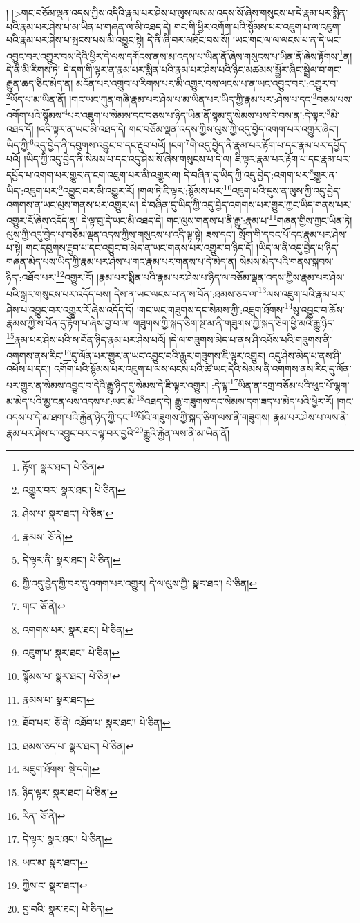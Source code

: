 ། །>གང་བཅོམ་ལྡན་འདས་ཀྱིས་འདིའི་རྣམ་པར་ཤེས་པ་ལུས་ལས་མ་འདས་སོ་ཞེས་གསུངས་པ་དེ་རྣམ་པར་སྨིན་པའི་རྣམ་པར་ཤེས་པ་མ་ཡིན་པ་གཞན་ལ་མི་འཐད་དེ། གང་གི་ཕྱིར་འགོག་པའི་སྙོམས་པར་འཇུག་པ་ལ་འཇུག་པའི་རྣམ་པར་ཤེས་པ་སྤངས་པས་མི་འབྱུང་སྟེ། དེ་ནི་ཞི་བར་མཐོང་བས་སོ། །ཡང་གང་ལ་ལ་ལངས་པ་ན་དེ་ཡང་འབྱུང་བར་འགྱུར་བས་དེའི་ཕྱིར་དེ་ལས་དགོངས་ནས་མ་འདས་པ་ཡིན་ནོ་ཞེས་གསུངས་པ་ཡིན་ནོ་ཞེས་རྟོགས་\footnote{རྟོག་  སྣར་ཐང་།  པེ་ཅིན། }ན། དེ་ནི་མི་རིགས་ཏེ། དེ་དག་གི་ལྟར་ན་རྣམ་པར་སྨིན་པའི་རྣམ་པར་ཤེས་པའི་ཉིང་མཚམས་སྦྱོར་ཞིང་སྦྲེལ་བ་གང་རྒྱུན་ཆད་ཅིང་མེད་ན། མངོན་པར་འགྲུབ་པ་རིགས་པར་མི་འགྱུར་བས་ལངས་པ་ན་ཡང་འབྱུང་བར་:འགྱུར་བ་\footnote{འགྱུར་བར་  སྣར་ཐང་།  པེ་ཅིན། }ཡོད་པ་མ་ཡིན་ནོ། །གང་ཡང་ཀུན་གཞི་རྣམ་པར་ཤེས་པ་མ་ཡིན་པར་ཡིད་ཀྱི་རྣམ་པར་:ཤེས་པ་དང་\footnote{ཤེས་པ་  སྣར་ཐང་།  པེ་ཅིན། }བཅས་པས་འགོག་པའི་སྙོམས་\footnote{རྣམས་  ཅོ་ནེ། }པར་འཇུག་པ་སེམས་དང་བཅས་པ་ཉིད་ཡིན་ནོ་སྙམ་དུ་སེམས་པས་དེ་བས་ན་:དེ་ལྟར་\footnote{དེ་ལྟར་ནི་  སྣར་ཐང་།  པེ་ཅིན། }མི་འཐད་དོ། །འདི་ལྟར་ན་ཡང་མི་འཐད་དེ། གང་བཅོམ་ལྡན་འདས་ཀྱིས་ལུས་ཀྱི་འདུ་བྱེད་འགག་པར་འགྱུར་ཞིང་། ཡིད་ཀྱི་\footnote{ཀྱི་འདུ་བྱེད་ཀྱི་བར་དུ་འགག་པར་འགྱུར། དེ་ལ་ལུས་ཀྱི་  སྣར་ཐང་།  པེ་ཅིན། }འདུ་བྱེད་ནི་དབུགས་འབྱུང་བ་དང་རྔུབ་པའོ། །ངག་\footnote{གང་  ཅོ་ནེ། }གི་འདུ་བྱེད་ནི་རྣམ་པར་རྟོག་པ་དང་རྣམ་པར་དཔྱོད་པའོ། །ཡིད་ཀྱི་འདུ་བྱེད་ནི་སེམས་པ་དང་འདུ་ཤེས་སོ་ཞེས་གསུངས་པ་དེ་ལ། ཇི་ལྟར་རྣམ་པར་རྟོག་པ་དང་རྣམ་པར་དཔྱོད་པ་འགག་པར་གྱུར་ན་ངག་འཇུག་པར་མི་འགྱུར་ལ། དེ་བཞིན་དུ་ཡིད་ཀྱི་འདུ་བྱེད་:འགག་པར་\footnote{འགགས་པར་  སྣར་ཐང་།  པེ་ཅིན། }གྱུར་ན་ཡིད་:འཇུག་པར་\footnote{འཇུག་པ་  སྣར་ཐང་།  པེ་ཅིན། }འབྱུང་བར་མི་འགྱུར་རོ། །གལ་ཏེ་ཇི་ལྟར་:སྙོམས་པར་\footnote{སྙོམས་པ་  སྣར་ཐང་།  པེ་ཅིན། }འཇུག་པའི་དུས་ན་ལུས་ཀྱི་འདུ་བྱེད་འགགས་ན་ཡང་ལུས་གནས་པར་འགྱུར་ལ། དེ་བཞིན་དུ་ཡིད་ཀྱི་འདུ་བྱེད་འགགས་པར་གྱུར་ཀྱང་ཡིད་གནས་པར་འགྱུར་རོ་ཞེས་འདོད་ན། དེ་ལྟ་བུ་དེ་ཡང་མི་འཐད་དེ། གང་ལུས་གནས་པ་ནི་རྒྱུ་:རྣམ་པ་\footnote{རྣམས་པ་  སྣར་ཐང་། }གཞན་གྱིས་ཀྱང་ཡིན་ཏེ། ལུས་ཀྱི་འདུ་བྱེད་པ་བཅོམ་ལྡན་འདས་ཀྱིས་གསུངས་པ་འདི་ལྟ་སྟེ། ཟས་དང་། སྲོག་གི་དབང་པོ་དང་རྣམ་པར་ཤེས་པ་སྟེ། གང་དབུགས་རྔུབ་པ་དང་འབྱུང་བ་མེད་ན་ཡང་གནས་པར་འགྱུར་བ་ཉིད་དོ། །ཡིད་ལ་ནི་འདུ་བྱེད་པ་ཉིད་གཞན་མེད་པས་ཡིད་ཀྱི་རྣམ་པར་ཤེས་པ་གང་རྣམ་པར་གནས་པ་དེ་མེད་ན། སེམས་མེད་པའི་གནས་སྐབས་ཉིད་:འཐོབ་པར་\footnote{ཐོབ་པར་  ཅོ་ནེ། འཐོབ་པ་  སྣར་ཐང་།  པེ་ཅིན། }འགྱུར་རོ། །རྣམ་པར་སྨིན་པའི་རྣམ་པར་ཤེས་པ་ཉིད་ལ་བཅོམ་ལྡན་འདས་ཀྱིས་རྣམ་པར་ཤེས་པའི་སྒྲར་གསུངས་པར་འདོད་པས། དེས་ན་ཡང་ལངས་པ་ན་ས་བོན་:ཐམས་ཅད་ལ་\footnote{ཐམས་ཅད་པ་  སྣར་ཐང་།  པེ་ཅིན། }ལས་འཇུག་པའི་རྣམ་པར་ཤེས་པ་འབྱུང་བར་འགྱུར་རོ་ཞེས་འདོད་དོ། །གང་ཡང་གཟུགས་དང་སེམས་ཀྱི་:འཇུག་ཐོགས་\footnote{མཇུག་ཐོགས་  སྡེ་དགེ། }སུ་འབྱུང་བ་ཆོས་རྣམས་ཀྱི་ས་བོན་དུ་རྟོག་པ་ཞེས་བྱ་བ་ལ། གཟུགས་ཀྱི་སྐད་ཅིག་སྔ་མ་ནི་གཟུགས་ཀྱི་སྐད་ཅིག་ཕྱི་མའི་རྒྱུ་ཉིད་\footnote{ཉིད་ལྟར་  སྣར་ཐང་།  པེ་ཅིན། }རྣམ་པར་ཤེས་པའི་ས་བོན་ཉིད་རྣམ་པར་ཤེས་པའོ། །དེ་ལ་གཟུགས་མེད་པ་ནས་ཤི་འཕོས་པའི་གཟུགས་ནི་འགགས་ནས་རིང་\footnote{རིན་  ཅོ་ནེ། }དུ་ལོན་པར་གྱུར་ན་ཡང་འབྱུང་བའི་རྒྱུར་གཟུགས་ཇི་ལྟར་འགྱུར། འདུ་ཤེས་མེད་པ་ནས་ཤི་འཕོས་པ་དང་། འགོག་པའི་སྙོམས་པར་འཇུག་པ་ལས་ལངས་པའི་ཚེ་ཡང་དེའི་སེམས་ནི་འགགས་ནས་རིང་དུ་ལོན་པར་གྱུར་ན་སེམས་འབྱུང་བ་དེའི་རྒྱུ་ཉིད་དུ་སེམས་དེ་ཇི་ལྟར་འགྱུར། :དེ་ལྟ་\footnote{དེ་ལྟར་  སྣར་ཐང་།  པེ་ཅིན། }ཡིན་ན་དགྲ་བཅོམ་པའི་ཕུང་པོ་ལྷག་མ་མེད་པའི་མྱ་ངན་ལས་འདས་པ་:ཡང་མི་\footnote{ཡང་མ་  སྣར་ཐང་། }འཐད་དེ། རྒྱུ་གཟུགས་དང་སེམས་དག་ཟད་པ་མེད་པའི་ཕྱིར་རོ། །གང་འདས་པ་དེ་མ་ཐག་པའི་རྐྱེན་ཉིད་ཀྱི་དང་\footnote{ཀྱིས་ང་  སྣར་ཐང་། }པོའི་གཟུགས་ཀྱི་སྐད་ཅིག་ལས་ནི་གཟུགས། རྣམ་པར་ཤེས་པ་ལས་ནི་རྣམ་པར་ཤེས་པ་འབྱུང་བར་བལྟ་བར་བྱའི་\footnote{བྱ་བའི་  སྣར་ཐང་།  པེ་ཅིན། }རྒྱུའི་རྐྱེན་ལས་ནི་མ་ཡིན་ནོ། 